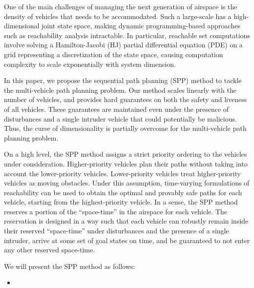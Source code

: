 One of the main challenges of managing the next generation of airspace is the density of vehicles that needs to be accommodated. Such a large-scale has a high-dimensional joint state space, making dynamic programming-based approaches such as reachability analysis intractable. In particular, reachable set computations involve solving a Hamilton-Jacobi (HJ) partial differential equation (PDE) on a grid representing a discretization of the state space, causing computation complexity to scale exponentially with system dimension. 

In this paper, we propose the sequential path planning (SPP) method to tackle the multi-vehicle path planning problem. Our method scales linearly with the number of vehicles, and provides hard guarantees on both the safety and liveness of all vehicles. These guarantees are maintained even under the presence of disturbances and a single intruder vehicle that could potentially be malicious. Thus, the curse of dimensionality is partially overcome for the multi-vehicle path planning problem. 

On a high level, the SPP method assigns a strict priority ordering to the vehicles under consideration. Higher-priority vehicles plan their paths without taking into account the lower-priority vehicles. Lower-priority vehicles treat higher-priority vehicles as moving obstacles. Under this assumption, time-varying formulations of reachability \cite{} can be used to obtain the optimal and provably safe paths for each vehicle, starting from the highest-priority vehicle. In a sense, the SPP method reserves a portion of the ``space-time'' in the airspace for each vehicle. The reservation is designed in a way such that each vehicle can robustly remain inside their reserved ``space-time'' under disturbances and the presence of a single intruder, arrive at some set of goal states on time, and be guaranteed to not enter any other reserved space-time.

We will present the SPP method as follows:
\begin{itemize}
\item 
\end{itemize}
